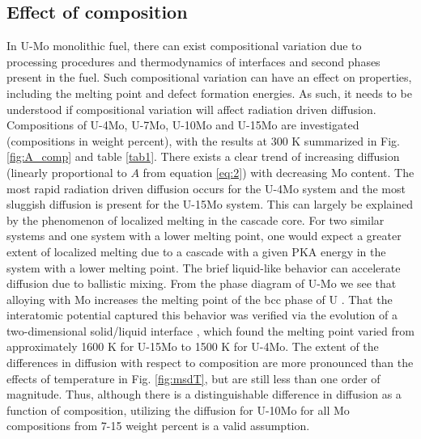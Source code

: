 \documentclass[review]{elsarticle}
\begin{document}
\FloatBarrier

\subsection{Effect of composition}

In U-Mo monolithic fuel, there can exist compositional variation due to processing procedures and thermodynamics of interfaces and second phases present in the fuel. Such compositional variation can have an effect on properties, including the melting point and defect formation energies. As such, it needs to be understood if compositional variation will affect radiation driven diffusion. Compositions of U-4Mo, U-7Mo, U-10Mo and U-15Mo are investigated (compositions in weight percent), with the results at 300 K summarized in Fig. \ref{fig:A_comp} and table \ref{tab1}. There exists a clear trend of increasing diffusion (linearly proportional to $A$ from equation \ref{eq:2}) with decreasing Mo content. The most rapid radiation driven diffusion occurs for the U-4Mo system and the most sluggish diffusion is present for the U-15Mo system. This can largely be explained by the phenomenon of localized melting in the cascade core. For two similar systems and one system with a lower melting point, one would expect a greater extent of localized melting due to a cascade with a given PKA energy in the system with a lower melting point. The brief liquid-like behavior can accelerate diffusion due to ballistic mixing. From the phase diagram of U-Mo we see that alloying with Mo increases the melting point of the bcc phase of U \cite{umo_handbook}. That the interatomic potential captured this behavior was verified via the evolution of a two-dimensional solid/liquid interface \cite{moore2015}, which found the melting point varied from approximately 1600 K for U-15Mo to 1500 K for U-4Mo. The extent of the differences in diffusion with respect to composition are more pronounced than the effects of temperature in Fig. \ref{fig:msdT}, but are still less than one order of magnitude. Thus, although there is a distinguishable difference in diffusion as a function of composition, utilizing the diffusion for U-10Mo for all Mo compositions from 7-15 weight percent is a valid assumption. 
\end{document}
